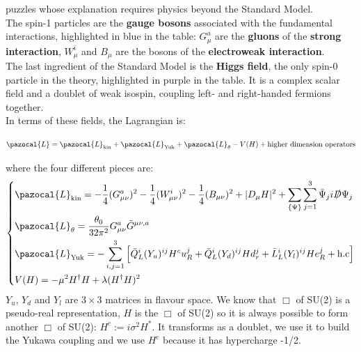 \documentclass[../main.tex]{subfiles}
\begin{document}
puzzles whose explanation requires physics beyond the Standard Model.\\
The spin-1 particles are the \textbf{gauge bosons} associated with the fundamental interactions, highlighted in blue in the table: $G_\mu^a$ are the \textbf{gluons} of the \textbf{strong interaction}, $W_\mu^i$ and $B_\mu$ are the bosons of the \textbf{electroweak interaction}.\\
The last ingredient of the Standard Model is the \textbf{Higgs field}, the only spin-0 particle in the theory, highlighted in purple in the table. It is a complex scalar field and a doublet of weak isospin, coupling left- and right-handed fermions together.\\
In terms of these fields, the Lagrangian is:
\begin{kaobox}[frametitle=Standard Model Lagrangian]
\[
\pazocal{L}=\pazocal{L}_{\text{kin}}+\pazocal{L}_{\text{Yuk}}+\pazocal{L}_\theta-V(H)+\text{higher dimension operators}
\]
\end{kaobox}
where the four different pieces are:
\[
\left\{
\begin{aligned}
&\pazocal{L}_{\text{kin}}=-\frac{1}{4}(G_{\mu\nu}^a)^2-\frac{1}{4}(W_{\mu\nu}^i)^2-\frac{1}{4}(B_{\mu\nu})^2+|D_\mu H|^2+\sum_{\{\Psi\}}\sum_{j=1}^{3}\Bar{\Psi}_ji\slashed{D}\Psi_j\\
&\pazocal{L}_\theta=\frac{\theta_0}{32\pi^2}G_{\mu\nu}^a\Tilde{G}^{\mu\nu,a}\\
&\pazocal{L}_{\text{Yuk}}=-\sum_{i,j=1}^3\left[\bar{Q}_L^i(Y_u)^{ij}H^cu_R^j+\bar{Q}_L^i(Y_d)^{ij}Hd_r^j+\bar{L}_L^i(Y_l)^{ij}He_R^j+\text{h.c}\right]\\
&V(H)=-\mu^2H^\dagger H+\lambda(H^\dagger H)^2
\end{aligned}
\right.
\]
$Y_u$, $Y_d$ and $Y_l$ are $3\times3$ matrices in flavour space. We know that $\Box$ of SU(2) is a pseudo-real representation, $H$ is the $\Box$ of SU(2) so it is always possible to form another $\Box$ of SU(2): $H^c:=i\sigma^2H^*$. It transforms as a doublet, we use it to build the Yukawa coupling and we use $H^c$ because it has hypercharge -1/2.\\
\end{document}
